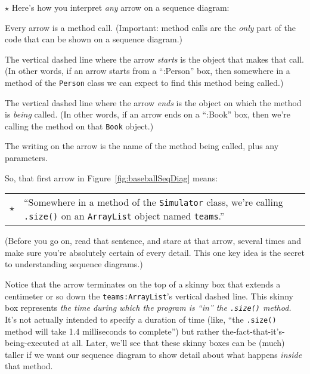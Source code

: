{\huge $\star$} Here's how you interpret \textit{any} arrow on a sequence diagram:

\begin{compactenum}
\item Every arrow is a method call. (Important: method calls are the
\textit{only} part of the code that can be shown on a sequence diagram.)
\item The vertical dashed line where the arrow \textit{starts} is the object
that makes that call. (In other words, if an arrow starts from a ``:Person''
box, then somewhere in a method of the \texttt{Person} class we can expect to
find this method being called.)
\item The vertical dashed line where the arrow \textit{ends} is the object on
which the method is \textit{being} called. (In other words, if an arrow ends
on a ``:Book'' box, then we're calling the method on that \texttt{Book}
object.)
\item The writing on the arrow is the name of the method being called, plus
any parameters.
\end{compactenum}

So, that first arrow in Figure~\ref{fig:baseballSeqDiag} means:

\begin{center}
\begin{tabular}{m{.1in} m{4in}}
\huge $\star$ & \large ``Somewhere in a method of the \texttt{Simulator} class, we're calling
\texttt{.size()} on an \texttt{ArrayList} object named \texttt{teams}.''
\end{tabular}
\end{center}

(Before you go on, read that sentence, and stare at that arrow, several times
and make sure you're absolutely certain of every detail. This one key idea is
the secret to understanding sequence diagrams.)

Notice that the arrow terminates on the top of a skinny box that extends a
centimeter or so down the \texttt{teams:ArrayList}'s vertical dashed line.
This skinny box represents \textit{the time during which the program is ``in''
the \texttt{.size()} method.} It's not actually intended to specify a duration
of time (like, ``the \texttt{.size()} method will take 1.4 milliseconds to
complete'') but rather the-fact-that-it's-being-executed at all. Later, we'll
see that these skinny boxes can be (much) taller if we want our sequence
diagram to show detail about what happens \textit{inside} that method.

